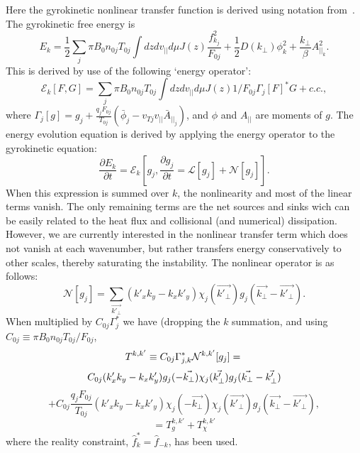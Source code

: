 \documentclass[11pt]{article}
\begin{document}
\begin{titlepage}
Here the gyrokinetic nonlinear transfer function is derived using notation from~\cite{F_thesis}.  The gyrokinetic free energy is 
\begin{equation}
E_{k}=\frac{1}{2}\sum_j \pi B_0 n_{0j} T_{0j} \int dz dv_{||} d\mu J(z) \frac{f_{k_j}^2}{F_{0j}} + \frac{1}{2}D(k_{\perp})\phi_k^2+\frac{k_{\perp}}{\beta}A_{||_k}^2.
\label{free_energy}
\end{equation}
This is derived by use of the following `energy operator':
\begin{equation}
\mathcal{E}_{k}[F,G]=\sum_j \pi B_0 n_{0j} T_{0j} \int dz dv_{||} d\mu J(z) 1/F_{0j}\Gamma_j[F]^*G + c.c.,
\label{nl_operator}
\end{equation}
where $\Gamma_j[g]=g_j+\frac{q_j F_{0j}}{T_{0j}}(\bar{\phi}_j-v_{Tj}v_{||}\bar{A}_{||_j})$, and $\phi$ and $A_{||}$ are moments of $g$.
The energy evolution equation is derived by applying the energy operator to the gyrokinetic equation:
\begin{equation}
\frac{\partial E_k}{\partial t}=\mathcal{E}_{k}\left[g_j,\frac{\partial g_j}{\partial t}=\mathcal{L}[g_j]+\mathcal{N}[g_j]\right].
\label{nl_operator}
\end{equation}
When this expression is summed over $k$, the nonlinearity and most of the linear terms vanish.  The only remaining terms are the net sources and sinks wich can be easily related to the heat flux and collisional (and numerical) dissipation.  However, we are currently interested in the nonlinear transfer term which does not vanish at each wavenumber, but rather transfers energy conservatively to other scales, thereby saturating the instability.  The nonlinear operator is as follows:
\begin{equation}
\mathcal{N}[g_j]=\displaystyle \sum_{\vec{k'_{\perp}}}(k'_xk_y-k_xk'_y)    \chi_j(\vec{k'_{\perp}})    g_j(\vec{k_{\perp}}-\vec{k'_{\perp}}).
\label{nl_operator}
\end{equation}
When multiplied by $C_{0j} \Gamma_j^*$ we have (dropping the $k$ summation, and using $C_{0j}\equiv \pi B_0 n_{0j} T_{0j}/F_{0j}$,
\begin{equation}
\nonumber T^{k,k'}\equiv C_{0j} \Gamma_{j,k}^* \mathcal{N}^{k,k'}[g_j]=\\
\label{nl_energy1}
\end{equation}
\begin{equation}
 C_{0j} (k'_xk_y-k_xk'_y)   g_j(-\vec{k_{\perp}}) \chi_j(\vec{k'_{\perp}})    g_j(\vec{k_{\perp}}-\vec{k'_{\perp}})\\
\label{nl_energy2}
\end{equation}
\begin{equation}
+C_{0j}\frac{q_jF_{0j}}{T_{0j}} (k'_xk_y-k_xk'_y)   \chi_j(-\vec{k_{\perp}}) \chi_j(\vec{k'_{\perp}})    g_j(\vec{k_{\perp}}-\vec{k'_{\perp}}),
\label{nl_energy3}
\end{equation}
\begin{equation}
\nonumber =T_g^{k,k'}+T_\chi^{k,k'}
\label{nl_energy4}
\end{equation}
where the reality constraint, $\hat{f}_k^*=\hat{f}_{-k}$, has been used.  


\end{titlepage}
\end{document}
